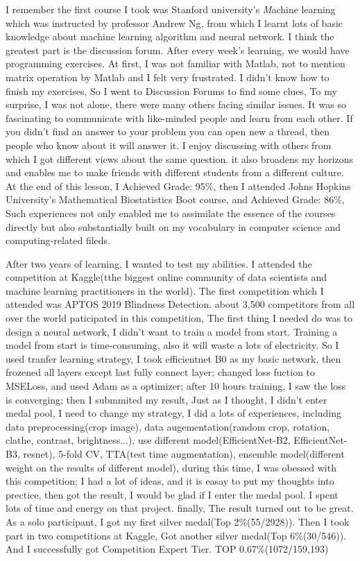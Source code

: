 \documentclass[12pt]{article}
\begin{document}
I remember the first course I took was Stanford university's \textit{M}achine learning which was instructed by professor Andrew Ng, from which I learnt lots of basic knowledge about machine learning algorithm and neural network. I think the greatest part is the discussion forum. After every week's learning, we would have programming exercises. At first, I was not familiar with Matlab, not to mention matrix operation by Matlab and I felt very frustrated. I didn't know how to finish my exercises, So I went to Discussion Forums to find some clues, To my surprise, I was not alone, there were many others facing similar issues. It was so fascinating to communicate with like-minded people and learn from each other. If you didn't find an answer to your problem you can open new a thread, then people who know about it will answer it. I enjoy discussing with others from which I got different views about the same question. it also broadens my horizons and enables me to make friends with different students from a different culture. At the end of this lesson, I Achieved Grade: 95\%, then I attended Johns Hopkins University's Mathematical Biostatistics Boot course, and Achieved Grade: 86\%, Such experiences not only enabled me to assimilate the essence of the courses directly but also substantially built on my vocabulary in computer science  and computing-related fileds.

\bigskip

After two years of learning, I wanted to test my abilities. I attended the competition at Kaggle(tthe biggest online community of data scientists and machine learning practitioners in the world). The first competition which I attended was APTOS 2019 Blindness Detection. about 3,500 competitors from all over the world paticipated in this competition, The first thing I needed do was to design a neural network, I didn't want to train a model from start. Training a model from start is time-consuming, also it will waste a lots of electricity. So I used tranfer learning strategy, I took efficientnet B0 as my basic network, then frozened all layers except last fully connect layer; changed loss fuction to MSELoss, and used Adam as a optimizer; after 10 hours training, I saw the loss is converging; then I submmited my result, Just as I thought, I didn't enter medal pool, I need to change my strategy, I did a lots of experiences, including data preprocessing(crop image), data augementation(random crop, rotation, clathe, contrast, brightness...), use different model(EfficientNet-B2, EfficientNet-B3, resnet),  5-fold CV, TTA(test time augmentation), ensemble model(different weight on the results of different model), during this time, I was obessed with this competition; I had a lot of ideas, and it is easay to put my thoughts into prectice, then got the result, I would be glad if I enter the medal pool. I spent lots of time and energy on that project. finally, The result turned out to be great. As a solo participant, I got my first silver medal(Top 2\%(55/2928)). Then I took part in two competitions at Kaggle, Got another silver medal(Top 6\%(30/546)). And I successfully got Competition Expert Tier. TOP 0.67\%(1072/159,193)
\end{document}
